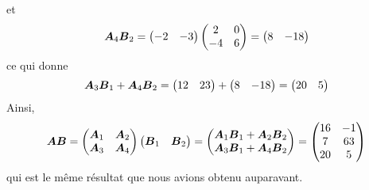 et
 \[
 \boldsymbol{A}_4 \boldsymbol{B}_2 =
 \begin{pmatrix}
 -2 & -3
 \end{pmatrix}
  \begin{pmatrix}
 2 & 0 \\
 -4 & 6
 \end{pmatrix}
 = \begin{pmatrix}
 8 & -18
 \end{pmatrix}
 \]
 ce qui donne
 \[
 \boldsymbol{A}_3\boldsymbol{B}_1 + \boldsymbol{A}_4\boldsymbol{B}_2 = 
 \begin{pmatrix}
 12 & 23
 \end{pmatrix} + 
 \begin{pmatrix}
 8 & -18
 \end{pmatrix}
 = \begin{pmatrix}
 20 & 5
 \end{pmatrix}
 \]
 Ainsi,
  \[
 \boldsymbol{A}\boldsymbol{B} = \begin{pmatrix}
 \boldsymbol{A}_1 & \boldsymbol{A}_2 \\
 \boldsymbol{A}_3 & \boldsymbol{A}_4
 \end{pmatrix}
 \begin{pmatrix}
 \boldsymbol{B}_1 & \boldsymbol{B}_2
 \end{pmatrix}
 = \begin{pmatrix}
 \boldsymbol{A}_1\boldsymbol{B}_1 + \boldsymbol{A}_2 \boldsymbol{B}_2\\
\boldsymbol{A}_3\boldsymbol{B}_1 + \boldsymbol{A}_4 \boldsymbol{B}_2
 \end{pmatrix}
 = \begin{pmatrix}
 16 & -1 \\
7 & 63\\
20 & 5
 \end{pmatrix}
 \]
 qui est le même résultat que nous avions obtenu auparavant.
 
